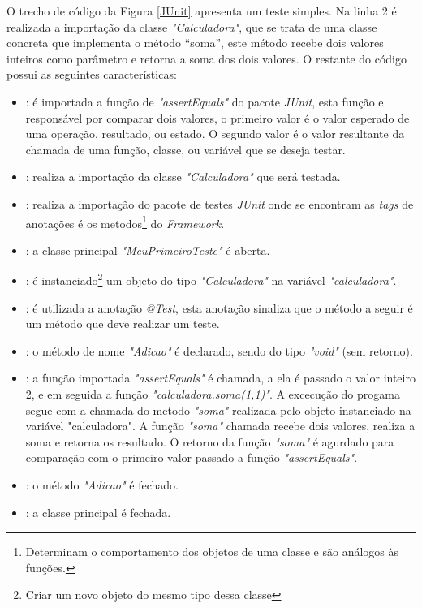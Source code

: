 O trecho de código da Figura \ref{JUnit} apresenta um teste simples. Na linha 2 é realizada a importação da classe \textit{"Calculadora"}, que se trata de uma classe concreta que implementa o método “soma”, este método recebe dois valores inteiros como parâmetro e retorna a soma dos dois valores.  O restante do código possui as seguintes características:

\begin{itemize}

\item[1]:  é importada a função de \textit{"assertEquals"} do pacote \textit{JUnit}, esta função e responsável por comparar dois valores, o primeiro valor é o valor esperado de uma operação, resultado, ou estado. O segundo valor é o valor resultante da chamada de uma função, classe, ou variável que se deseja testar. 

\item[2]: realiza a importação da classe \textit{"Calculadora"} que será testada. 

\item[3]: realiza a importação do pacote de testes \textit{JUnit} onde se encontram as \textit{tags} de anotações é os metodos\footnote{Determinam o comportamento dos objetos de uma classe e são análogos às funções.} do \textit{Framework}. 

\item[5]: a classe principal \textit{"MeuPrimeiroTeste"} é aberta. 

\item[7]: é instanciado\footnote{Criar um novo objeto do mesmo tipo dessa classe} um objeto do tipo \textit{"Calculadora"} na variável \textit{"calculadora"}. 

\item[9]: é utilizada a anotação \textit{@Test}, esta anotação sinaliza que o método a seguir é um método que deve realizar um teste. 

\item[10]: o método de nome \textit{"Adicao"} é declarado, sendo do tipo \textit{"void"} (sem retorno). 

\item[11]: a função importada \textit{"assertEquals"} é chamada, a ela é passado o valor inteiro 2, e em seguida a função \textit{"calculadora.soma(1,1)"}. A excecução do progama segue com a chamada do metodo  \textit{"soma"} realizada pelo objeto instanciado na variável "calculadora". A função \textit{"soma"} chamada recebe dois valores, realiza a soma e retorna os resultado. O retorno da função \textit{"soma"} é agurdado para comparação com o primeiro valor passado a função \textit{"assertEquals"}.

\item[12]: o método \textit{"Adicao"} é fechado.

\item[13]: a classe principal é fechada.

\end{itemize}

